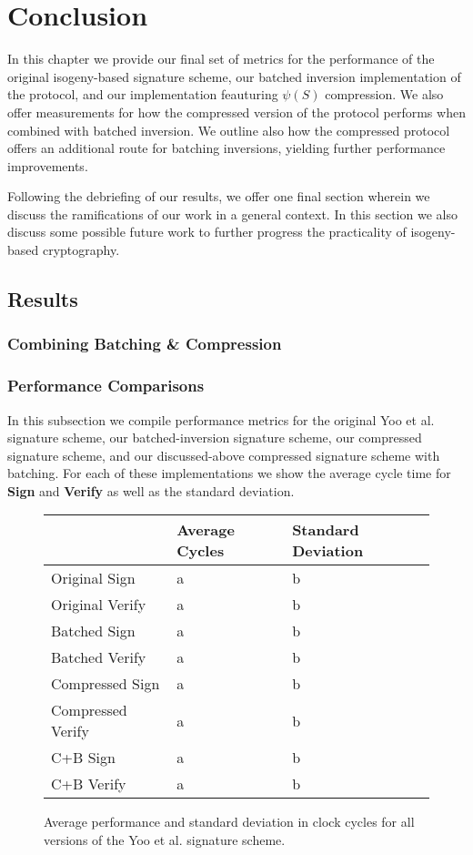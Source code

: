 \chapter{Conclusion}
\label{ch:conclusion}

In this chapter we provide our final set of metrics for the performance of the original isogeny-based signature scheme, our batched inversion implementation of the protocol, and our implementation feauturing $\psi(S)$ compression. We also offer measurements for how the compressed version of the protocol performs when combined with batched inversion. We outline also how the compressed protocol offers an additional route for batching inversions, yielding further performance improvements.

Following the debriefing of our results, we offer one final section wherein we discuss the ramifications of our work in a general context. In this section we also discuss some possible future work to further progress the practicality of isogeny-based cryptography.



\section{Results}

\subsection{Combining Batching \& Compression}

\subsection{Performance Comparisons}

In this subsection we compile performance metrics for the original Yoo et al. signature scheme, our batched-inversion signature scheme, our compressed signature scheme, and our discussed-above compressed signature scheme with batching. For each of these implementations we show the average cycle time for \textbf{Sign} and \textbf{Verify} as well as the standard deviation.

\begin{figure}
\begin{center}
\begin{tabular}{ | l | b | b | }
\hline
& Average Cycles & Standard Deviation \\
\hline
Original Sign & a & b \\
Original Verify & a & b \\
Batched Sign & a & b \\
Batched Verify & a & b \\
Compressed Sign & a & b \\
Compressed Verify & a & b \\
C+B Sign & a & b \\
C+B Verify & a & b \\
\hline
\end{tabular}
\end{center}
\caption{Average performance and standard deviation in clock cycles for all versions of the Yoo et al. signature scheme.}
\label{fig:allmeasurements}
\end{figure}

